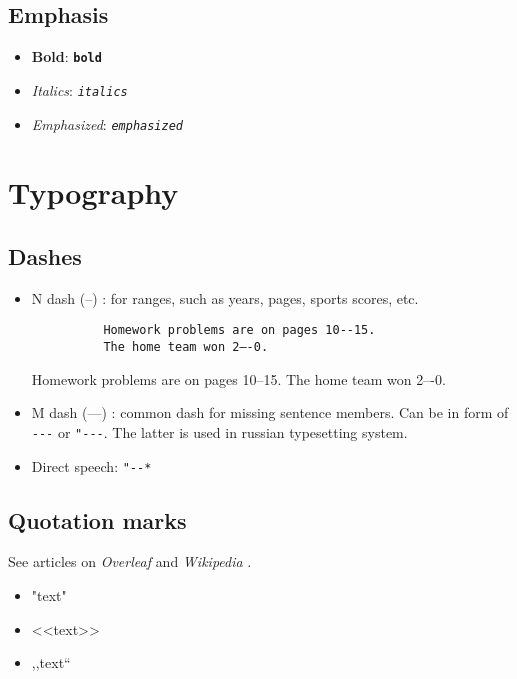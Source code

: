 \subsection{Emphasis}
\begin{itemize}
  \item \textbf{Bold}: \texttt{\textbf{bold}}
  \item \textit{Italics}: \texttt{\textit{italics}}
  \item \emph{Emphasized}: \texttt{\emph{emphasized}}
\end{itemize}

\section{Typography}
\subsection{Dashes}
\begin{itemize}
  \item N dash (--) \autocite{thesauruscom-en-dash-2022}: for ranges, such as years, pages, sports scores, etc.
        \begin{verbatim}
          Homework problems are on pages 10--15.
          The home team won 2–-0.
        \end{verbatim}
        \begin{mdframed}[style=example]
          Homework problems are on pages 10--15.
          The home team won 2–-0.
        \end{mdframed}
  \item M dash (---) \autocite{thesauruscom-em-dash-2022}: common dash for missing sentence members. Can be in form of \verb|---| or \verb|"---|.
        The latter is used in russian typesetting system.
  \item Direct speech: \verb|"--*|
\end{itemize}

\subsection{Quotation marks}
See articles on \emph{Overleaf} \autocite{Overleaf-quotes-2018} and \emph{Wikipedia} \autocite{Wikipedia-quotes-2006}.
\begin{itemize}
  \item "text"
  \item <<text>>
  \item ,,text``
\end{itemize}

